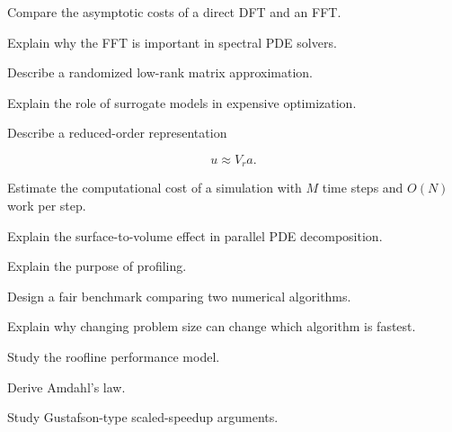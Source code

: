 \begin{exercise}[3]
Compare the asymptotic costs of a direct DFT and an FFT.
\end{exercise}

\begin{exercise}[3]
Explain why the FFT is important in spectral PDE solvers.
\end{exercise}

\begin{exercise}[3]
Describe a randomized low-rank matrix approximation.
\end{exercise}

\begin{exercise}[3]
Explain the role of surrogate models in expensive optimization.
\end{exercise}

\begin{exercise}[3]
Describe a reduced-order representation

\[
u\approx V_ra.
\]
\end{exercise}

\begin{exercise}[3]
Estimate the computational cost of a simulation with \(M\) time steps and
\(O(N)\) work per step.
\end{exercise}

\begin{exercise}[3]
Explain the surface-to-volume effect in parallel PDE decomposition.
\end{exercise}

\begin{exercise}[3]
Explain the purpose of profiling.
\end{exercise}

\begin{exercise}[3]
Design a fair benchmark comparing two numerical algorithms.
\end{exercise}

\begin{exercise}[3]
Explain why changing problem size can change which algorithm is fastest.
\end{exercise}

\begin{exercise}[4]
Study the roofline performance model.
\end{exercise}

\begin{exercise}[4]
Derive Amdahl's law.
\end{exercise}

\begin{exercise}[4]
Study Gustafson-type scaled-speedup arguments.
\end{exercise}

